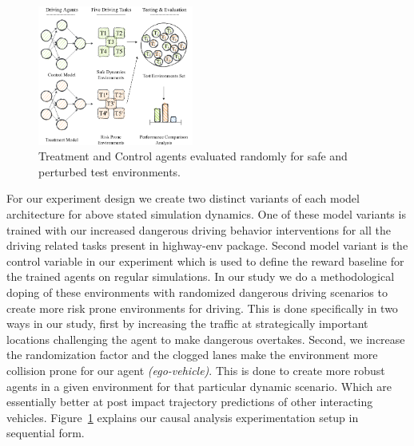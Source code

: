 \documentclass[a4, conference]{IEEEtran}
\begin{document}
    \begin{figure}
        \centering
        \includegraphics[width=0.455\textwidth]{experimentation-diagram.png}
        \caption{Treatment and Control agents evaluated randomly for safe and perturbed test environments.}
        \label{fig1}
    \end{figure}

    For our experiment design we create two distinct variants of each model architecture for above stated simulation dynamics. One of these model variants is trained with our increased dangerous driving behavior interventions for all the driving related tasks present in highway-env package. Second model variant is the control variable in our experiment which is used to define the reward baseline for the trained agents on regular simulations. In our study we do a methodological doping of these environments with randomized dangerous driving scenarios to create more risk prone environments for driving. This is done specifically in two ways in our study, first by increasing the traffic at strategically important locations challenging the agent to make dangerous overtakes. Second, we increase the randomization factor and the clogged lanes make the environment more collision prone for our agent \textit{(ego-vehicle)}. This is done to create more robust agents in a given environment for that particular dynamic scenario. Which are essentially better at post impact trajectory predictions of other interacting vehicles. Figure~\ref{fig1} explains our causal analysis experimentation setup in sequential form.
\end{document}
